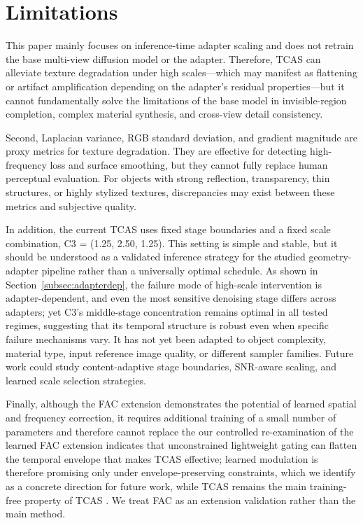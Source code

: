 \documentclass[times,twocolumn,final]{elsarticle}
\providecommand{\DIFadd}[1]{{\protect\color{red} \sf #1}} %
\providecommand{\DIFdel}[1]{{\protect\color{red} \scriptsize #1}} %
\providecommand{\DIFaddbegin}{} %
\providecommand{\DIFaddend}{} %
\providecommand{\DIFdelbegin}{} %
\providecommand{\DIFdelend}{} %
\newcommand{\DIFscaledelfig}{0.5}
\newlength{\DIFdelgraphicswidth} %
\newlength{\DIFdelgraphicsheight} %
\newcommand{\DIFaddincludegraphics}[2][]{{\color{red}\fbox{\DIFOincludegraphics[#1]{#2}}}} %
\newcommand{\DIFdelincludegraphics}[2][]{%
\sbox{\DIFdelgraphicsbox}{\DIFOincludegraphics[#1]{#2}}%
\settoboxwidth{\DIFdelgraphicswidth}{\DIFdelgraphicsbox} %
\settoboxtotalheight{\DIFdelgraphicsheight}{\DIFdelgraphicsbox} %
\scalebox{\DIFscaledelfig}{%
\parbox[b]{\DIFdelgraphicswidth}{\usebox{\DIFdelgraphicsbox}\\[-\baselineskip] \rule{\DIFdelgraphicswidth}{0em}}\llap{\resizebox{\DIFdelgraphicswidth}{\DIFdelgraphicsheight}{%
\setlength{\unitlength}{\DIFdelgraphicswidth}%
\begin{picture}(1,1)%
\thicklines\linethickness{2pt} %
{\color[rgb]{1,0,0}\put(0,0){\framebox(1,1){}}}%
{\color[rgb]{1,0,0}\put(0,0){\line( 1,1){1}}}%
{\color[rgb]{1,0,0}\put(0,1){\line(1,-1){1}}}%
\end{picture}%
}\hspace*{3pt}}} %
} %
\DeclareRobustCommand{\DIFaddbegin}{\DIFOaddbegin \let\includegraphics\DIFaddincludegraphics} %
\DeclareRobustCommand{\DIFaddend}{\DIFOaddend \let\includegraphics\DIFOincludegraphics} %
\DeclareRobustCommand{\DIFdelbegin}{\DIFOdelbegin \let\includegraphics\DIFdelincludegraphics} %
\DeclareRobustCommand{\DIFdelend}{\DIFOaddend \let\includegraphics\DIFOincludegraphics} %
\begin{document}
\DIFaddend \section{Limitations}
\label{sec:limitations}

This paper mainly focuses on inference-time adapter scaling and does not retrain the base multi-view diffusion model or the adapter. Therefore, TCAS can alleviate texture degradation under high scales---which may manifest as flattening or artifact amplification depending on the adapter's residual properties---but it cannot fundamentally solve the limitations of the base model in invisible-region completion, complex material synthesis, and cross-view detail consistency.

Second, Laplacian variance, RGB standard deviation, and gradient magnitude are proxy metrics for texture degradation. They are effective for detecting high-frequency loss and surface smoothing, but they cannot fully replace human perceptual evaluation. For objects with strong reflection, transparency, thin structures, or highly stylized textures, discrepancies may exist between these metrics and subjective quality.

In addition, the current TCAS uses fixed stage boundaries and a fixed scale combination, C3 = (1.25, 2.50, 1.25). This setting is simple and stable, but it should be understood as a validated inference strategy for the studied geometry-adapter pipeline rather than a universally optimal schedule. As shown in Section~\ref{subsec:adapterdep}, the failure mode of high-scale intervention is adapter-dependent, and even the most sensitive denoising stage differs across adapters; yet C3's middle-stage concentration remains optimal in all tested regimes, suggesting that its temporal structure is robust even when specific failure mechanisms vary. It has not yet been adapted to object complexity, material type, input reference image quality, or different sampler families. Future work could study content-adaptive stage boundaries, SNR-aware scaling, and learned scale selection strategies.

Finally, \DIFdelbegin \DIFdel{although the FAC extension demonstrates the potential of learned spatial and frequency correction, it requires additional training of a small number of parameters and therefore cannot replace the }\DIFdelend \DIFaddbegin \DIFadd{our controlled re-examination of the learned FAC extension indicates that unconstrained lightweight gating can flatten the temporal envelope that makes TCAS effective; learned modulation is therefore promising only under envelope-preserving constraints, which we identify as a concrete direction for future work, while TCAS remains the main }\DIFaddend training-free \DIFdelbegin \DIFdel{property of TCAS . We treat FAC as an extension validation rather than the main }\DIFdelend method.
\end{document}
